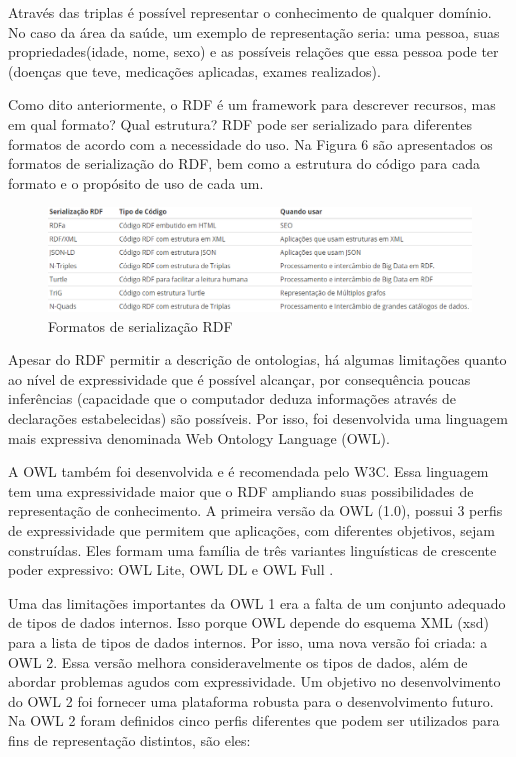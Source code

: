     	Através das triplas é possível representar o conhecimento de qualquer domínio. No caso da área da saúde, um exemplo de representação seria: uma pessoa, suas propriedades(idade, nome, sexo) e as possíveis relações que essa pessoa pode ter (doenças que teve, medicações aplicadas, exames realizados). 
        
        Como dito anteriormente, o RDF é um framework para descrever recursos, mas em qual formato? Qual estrutura? RDF pode ser serializado para diferentes formatos de acordo com a necessidade do uso. Na Figura 6 são apresentados os formatos de serialização do RDF, bem como a estrutura do código para cada formato e o propósito de uso de cada um.
         
         \begin{figure}[htbp]
        	\centering
            \caption{Formatos de serialização RDF}
            \label{fig:owl2-profiles}
            \includegraphics[width=1\linewidth]{images/serializacoes-rdf.png}
        \end{figure}
        
        Apesar do RDF permitir a descrição de ontologias, há algumas limitações quanto ao nível de expressividade que é possível alcançar, por consequência poucas inferências (capacidade que o computador deduza informações através de declarações estabelecidas) são possíveis. Por isso, foi desenvolvida uma linguagem mais expressiva denominada Web Ontology Language (OWL).
        
        A OWL também foi desenvolvida e é recomendada pelo W3C. Essa linguagem tem uma expressividade maior que o RDF ampliando suas possibilidades de representação de conhecimento. A primeira versão da OWL (1.0), possui 3 perfis de expressividade que permitem que aplicações, com diferentes objetivos, sejam construídas. Eles formam uma família de três variantes linguísticas de crescente poder expressivo: OWL Lite, OWL DL e OWL Full \cite{isotani2015dados}.
        
        Uma das limitações importantes da OWL 1 era a falta de um conjunto adequado de tipos de dados internos. Isso porque OWL depende do esquema XML (xsd) para a lista de tipos de dados internos. Por isso, uma nova versão foi criada: a OWL 2. Essa versão melhora consideravelmente os tipos de dados, além de abordar problemas agudos com expressividade. Um objetivo no desenvolvimento do OWL 2 foi fornecer uma plataforma robusta para o desenvolvimento futuro. Na OWL 2 foram definidos cinco perfis diferentes que podem ser utilizados para fins de representação distintos, são eles:
        

